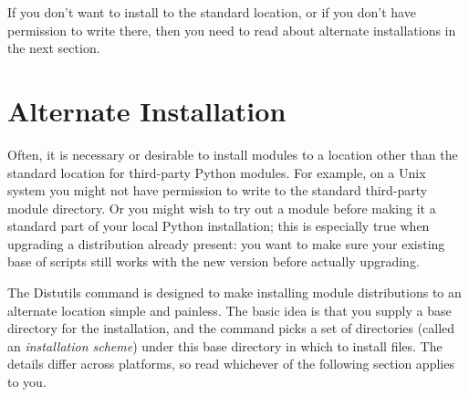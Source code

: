 \documentclass{howto}
\begin{document}
If you don't want to install to the standard location, or if you don't
have permission to write there, then you need to read about alternate
installations in the next section.



\newcommand{\installscheme}[8]
  {\begin{tableiii}{lll}{textrm}
          {Type of file}
          {Installation Directory}
          {Override option}
     \lineiii{pure module distribution}
             {\filevar{#1}\filenq{#2}}
             {\longprogramopt{install-purelib}}
     \lineiii{non-pure module distribution}
             {\filevar{#3}\filenq{#4}}
             {\longprogramopt{install-platlib}}
     \lineiii{scripts}
             {\filevar{#5}\filenq{#6}}
             {\longprogramopt{install-scripts}}
     \lineiii{data}
             {\filevar{#7}\filenq{#8}}
             {\longprogramopt{install-data}}
   \end{tableiii}}

\section{Alternate Installation}
\label{sec:alt-install}

Often, it is necessary or desirable to install modules to a location
other than the standard location for third-party Python modules.  For
example, on a Unix system you might not have permission to write to the
standard third-party module directory.  Or you might wish to try out a
module before making it a standard part of your local Python
installation; this is especially true when upgrading a distribution
already present: you want to make sure your existing base of scripts
still works with the new version before actually upgrading.

The Distutils  command is designed to make installing
module distributions to an alternate location simple and painless.  The
basic idea is that you supply a base directory for the installation, and
the  command picks a set of directories (called an
\emph{installation scheme}) under this base directory in which to
install files.  The details differ across platforms, so read whichever
of the following section applies to you.
\end{document}
